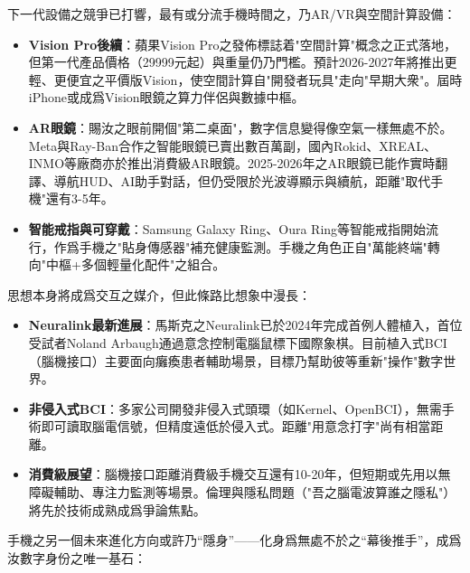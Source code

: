 


下一代設備之競爭已打響，最有或分流手機時間之，乃AR/VR與空間計算設備：

\begin{itemize}
  \item \textbf{Vision Pro後續}：蘋果Vision Pro之發佈標誌着"空間計算"概念之正式落地，但第一代產品價格（29999元起）與重量仍乃門檻。預計2026-2027年將推出更輕、更便宜之平價版Vision，使空間計算自"開發者玩具"走向"早期大衆"。屆時iPhone或成爲Vision眼鏡之算力伴侶與數據中樞。
  \item \textbf{AR眼鏡}：賜汝之眼前開個"第二桌面"，數字信息變得像空氣一樣無處不於。Meta與Ray-Ban合作之智能眼鏡已賣出數百萬副，國內Rokid、XREAL、INMO等廠商亦於推出消費級AR眼鏡。2025-2026年之AR眼鏡已能作實時翻譯、導航HUD、AI助手對話，但仍受限於光波導顯示與續航，距離"取代手機"還有3-5年。
  \item \textbf{智能戒指與可穿戴}：Samsung Galaxy Ring、Oura Ring等智能戒指開始流行，作爲手機之"貼身傳感器"補充健康監測。手機之角色正自"萬能終端"轉向"中樞+多個輕量化配件"之組合。
\end{itemize}


思想本身將成爲交互之媒介，但此條路比想象中漫長：

\begin{itemize}
  \item \textbf{Neuralink最新進展}：馬斯克之Neuralink已於2024年完成首例人體植入，首位受試者Noland Arbaugh通過意念控制電腦鼠標下國際象棋。目前植入式BCI（腦機接口）主要面向癱瘓患者輔助場景，目標乃幫助彼等重新"操作"數字世界。
  \item \textbf{非侵入式BCI}：多家公司開發非侵入式頭環（如Kernel、OpenBCI），無需手術即可讀取腦電信號，但精度遠低於侵入式。距離"用意念打字"尚有相當距離。
  \item \textbf{消費級展望}：腦機接口距離消費級手機交互還有10-20年，但短期或先用以無障礙輔助、專注力監測等場景。倫理與隱私問題（"吾之腦電波算誰之隱私"）將先於技術成熟成爲爭論焦點。
\end{itemize}


手機之另一個未來進化方向或許乃“隱身”——化身爲無處不於之“幕後推手”，成爲汝數字身份之唯一基石：

